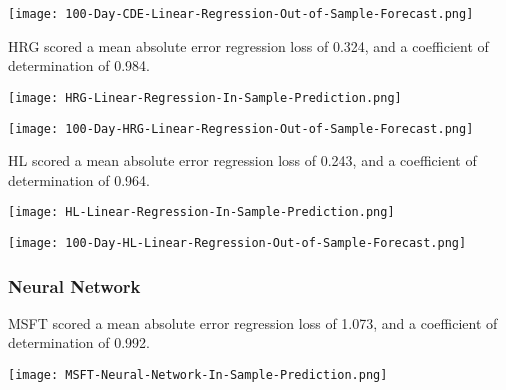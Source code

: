 \begin{center}  
    \texttt{[image: 100-Day-CDE-Linear-Regression-Out-of-Sample-Forecast.png]}
    \label{fig:nonfloat}
\end{center}

HRG scored a mean absolute error regression loss of 0.324, and a coefficient of determination of 0.984.

\begin{center}
    \texttt{[image: HRG-Linear-Regression-In-Sample-Prediction.png]}
    \label{fig:nonfloat}
\end{center}

\begin{center}  
    \texttt{[image: 100-Day-HRG-Linear-Regression-Out-of-Sample-Forecast.png]}
    \label{fig:nonfloat}
\end{center}

HL scored a mean absolute error regression loss of 0.243, and a coefficient of determination of 0.964.

\begin{center}
    \texttt{[image: HL-Linear-Regression-In-Sample-Prediction.png]}
    \label{fig:nonfloat}
\end{center}

\begin{center}  
    \texttt{[image: 100-Day-HL-Linear-Regression-Out-of-Sample-Forecast.png]}
    \label{fig:nonfloat}
\end{center}

\subsubsection{Neural Network}
MSFT scored a mean absolute error regression loss of 1.073, and a coefficient of determination of 0.992.

\begin{center}
    \texttt{[image: MSFT-Neural-Network-In-Sample-Prediction.png]}
    \label{fig:nonfloat}
\end{center}

